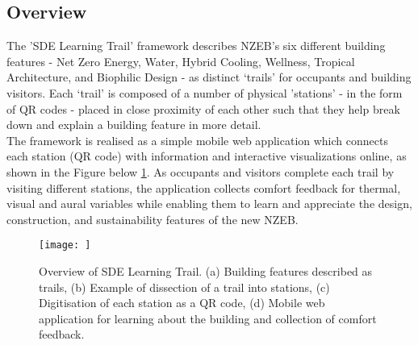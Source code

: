 

\subsection{Overview}

The 'SDE Learning Trail' framework describes NZEB's six different building features - Net Zero Energy, Water, Hybrid Cooling, Wellness, Tropical Architecture, and Biophilic Design - as distinct ‘trails’ for occupants and building visitors. Each ‘trail’ is composed of a number of physical 'stations' - in the form of QR codes - placed in close proximity of each other such that they help break down and explain a building feature in more detail.\\

The framework is realised as a simple mobile web application which connects each station (QR code) with information and interactive visualizations online, as shown in the Figure below \ref{fig:framework}. As occupants and visitors complete each trail by visiting different stations, the application collects comfort feedback for thermal, visual and aural variables while enabling them to learn and appreciate the design, construction, and sustainability features of the new NZEB.\\

\begin{figure}
\begin{center}
\texttt{[image: ]}
\caption{Overview of SDE Learning Trail. (a) Building features described as trails, (b) Example of dissection of a trail into stations, (c) Digitisation of each station as a QR code, (d) Mobile web application for learning about the building and collection of comfort feedback.}
\label{fig:framework}
\end{center}
\end{figure}



